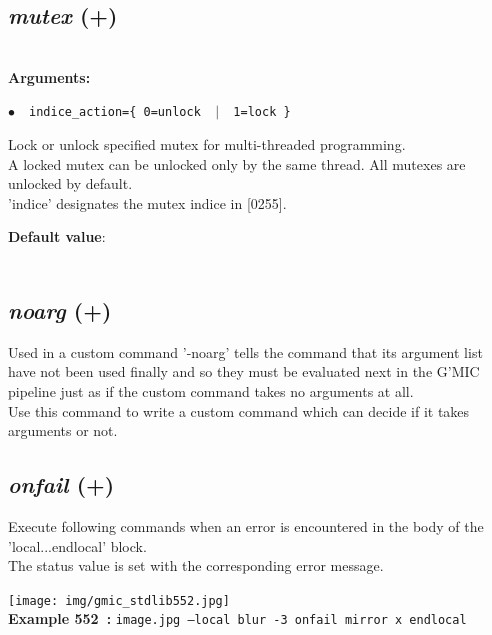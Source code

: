 \documentclass[a4paper,10.5pt,twoside]{book}
\def\comma{\discretionary{,}{}{,}}
\newcommand{\Cb}[1]{\textcolor{cb}{#1}}
\newcommand{\Cc}[1]{\textcolor{cc}{#1}}
\begin{document}
\subsection{\emph{mutex} (+)}\vspace*{-0.7em}
~\\\textbf{\Cb{Arguments: }}\begin{flushleft}
{\small \Cb{\hspace*{0.5cm}$\bullet$~~\texttt{indice{\comma}\_action=\{ 0=unlock ~$|$~ 1=lock \}}}}\end{flushleft}
Lock or unlock specified mutex for multi-threaded programming.
~\\A locked mutex can be unlocked only by the same thread. All mutexes are unlocked by default.
~\\'indice' designates the mutex indice{\comma} in [0{\comma}255].
\begin{flushleft}\Cc{\textbf{Default value}:\\~\\\hspace*{0.5cm}{\small $\bullet$~~\texttt{'action=1'.}}}\end{flushleft}


\subsection{\emph{noarg} (+)}\vspace*{-0.7em}
Used in a custom command{\comma} '-noarg' tells the command that its argument list have not been used
finally{\comma} and so they must be evaluated next in the G'MIC pipeline{\comma} just as if the custom
command takes no arguments at all.
~\\Use this command to write a custom command which can decide if it takes arguments or not.


\subsection{\emph{onfail} (+)}\vspace*{-0.7em}
Execute following commands when an error is encountered in the body of the 'local...endlocal' block.
~\\The status value is set with the corresponding error message.
\begin{center}\texttt{[image: img/gmic\_stdlib552.jpg]}\\
{\footnotesize \textbf{Example 552~:} \texttt{image.jpg --local blur -3 onfail mirror x endlocal}}
\end{center}
\end{document}
